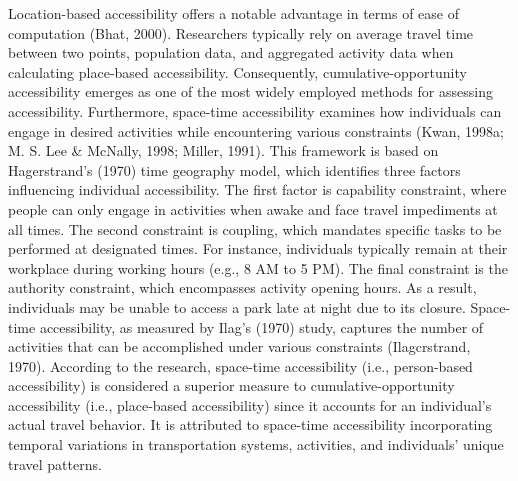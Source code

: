\documentclass[12pt,twoside]{reedthesis}
\begin{document}
Location-based accessibility offers a notable advantage in terms of ease of computation (Bhat, 2000). Researchers typically rely on average travel time between two points, population data, and aggregated activity data when calculating place-based accessibility. Consequently, cumulative-opportunity accessibility emerges as one of the most widely employed methods for assessing accessibility. Furthermore, space-time accessibility examines how individuals can engage in desired activities while encountering various constraints (Kwan, 1998a; M. S. Lee \& McNally, 1998; Miller, 1991). This framework is based on Hagerstrand's (1970) time geography model, which identifies three factors influencing individual accessibility. The first factor is capability constraint, where people can only engage in activities when awake and face travel impediments at all times. The second constraint is coupling, which mandates specific tasks to be performed at designated times. For instance, individuals typically remain at their workplace during working hours (e.g., 8 AM to 5 PM). The final constraint is the authority constraint, which encompasses activity opening hours. As a result, individuals may be unable to access a park late at night due to its closure. Space-time accessibility, as measured by Ilag's (1970) study, captures the number of activities that can be accomplished under various constraints (Ilagcrstrand, 1970). According to the research, space-time accessibility (i.e., person-based accessibility) is considered a superior measure to cumulative-opportunity accessibility (i.e., place-based accessibility) since it accounts for an individual's actual travel behavior. It is attributed to space-time accessibility incorporating temporal variations in transportation systems, activities, and individuals' unique travel patterns.
\end{document}
